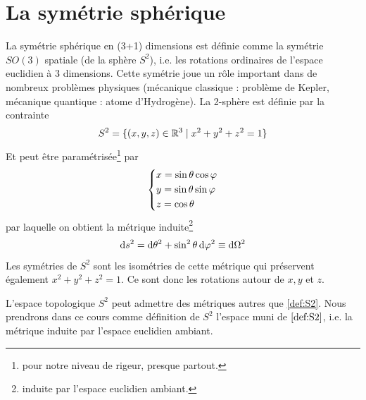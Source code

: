 \section{La symétrie sphérique}
La symétrie sphérique en (3+1) dimensions est définie comme la symétrie $SO(3)$ spatiale (de la sphère $S^2$), i.e. les rotations ordinaires de l'espace euclidien à 3 dimensions. Cette symétrie joue un rôle important dans de nombreux problèmes physiques (mécanique classique : problème de Kepler, mécanique quantique : atome d'Hydrogène). La 2-sphère est définie par la contrainte
\begin{equation}
    S^2 = \{ (x,y,z) \in \mathbb{R}^3 \mid x^2 +y^2 +z^2 = 1 \}
\end{equation}
Et peut être paramétrisée\footnote{pour notre niveau de rigeur, presque partout.} par
\begin{align}
    \label{def:coordonnées sphériques}
    \begin{dcases}
        x = \sin \theta \cos\varphi \\
        y = \sin \theta \sin \varphi \\
        z = \cos \theta
    \end{dcases}
\end{align}
par laquelle on obtient la métrique induite\footnote{induite par l'espace euclidien ambiant.}
\begin{equation}
    \label{def:S2}
    \mathrm{d} s^2 = \mathrm{d} \theta ^2 + \sin ^2 \theta \, \mathrm{d} \varphi^2 \equiv \mathrm{d} \Omega^2
\end{equation}
Les symétries de $S^2$ sont les isométries de cette métrique qui préservent également $x^2 + y^2 +z^2 =1$. Ce sont donc les rotations autour de $x, y$ et $z$. 
\begin{rmk}
    L'espace topologique $S^2$ peut admettre des métriques autres que \ref{def:S2}. Nous prendrons dans ce cours comme définition de $S^2$ l'espace muni de $\ref{def:S2}$, i.e. la métrique induite par l'espace euclidien ambiant.
\end{rmk}
